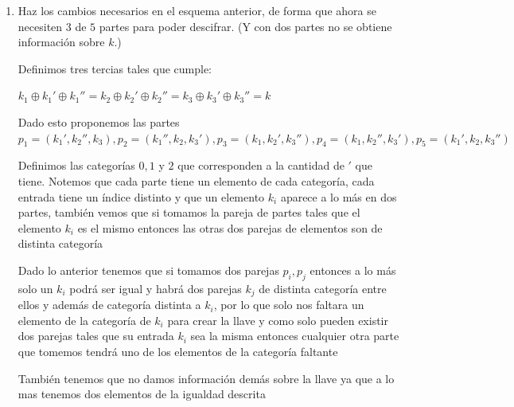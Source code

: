 \documentclass[11pt]{article}
\begin{document}
\begin{enumerate}[label=\alph*)]
\begin{itemize}
                \item Si juntamos $(p_2, p_3)$ tememos la igualdad $k_1 \oplus k_{1}' = k = k_2 \oplus k_{2}'$
            \end{itemize}
            
            \item Haz los cambios necesarios en el esquema anterior, de forma que ahora se necesiten $3$ de $5$ partes para poder descifrar. (Y con dos partes no se obtiene información sobre $k$.)
            
            Definimos tres tercias tales que cumple:
            
            \begin{center}
            $k_1 \oplus k_1' \oplus k_1'' = k_2 \oplus k_2' \oplus k_2'' = k_3 \oplus k_3' \oplus k_3'' = k$
            
            \end{center}
            
                
            Dado esto proponemos las partes $p_1 = (k_1', k_2'',k_3), p_2 = (k_1'', k_2, k_3'), p_3 = (k_1, k_2', k_3''), p_4 = (k_1, k_2'',k_3'), p_5 = (k_1', k_2,k_3'')$
            
            
            Definimos las categorías $0,1$ y $2$ que corresponden a la cantidad de $'$ que tiene. Notemos que cada parte tiene un elemento de cada categoría, cada entrada tiene un índice distinto y que un elemento $k_i$ aparece a lo más en dos partes, también vemos que si tomamos la pareja de partes tales que el elemento $k_i$ es el mismo entonces las otras dos parejas de elementos son de distinta categoría
            
            Dado lo anterior tenemos que si tomamos dos parejas $p_i,p_j$ entonces a lo más solo un $k_i$ podrá ser igual y habrá dos parejas $k_j$ de distinta categoría entre ellos y además de categoría distinta a $k_i$, por lo que solo nos faltara un
            elemento de la categoría de $k_i$ para crear la llave y como solo pueden existir dos parejas tales que su entrada $k_i$ sea la misma entonces cualquier otra parte que tomemos tendrá uno de los elementos de la categoría faltante
            
            También tenemos que no damos información demás sobre la llave ya que a lo mas tenemos dos elementos de la igualdad descrita
            
            
        \end{enumerate}
        
        
        
\end{document}
